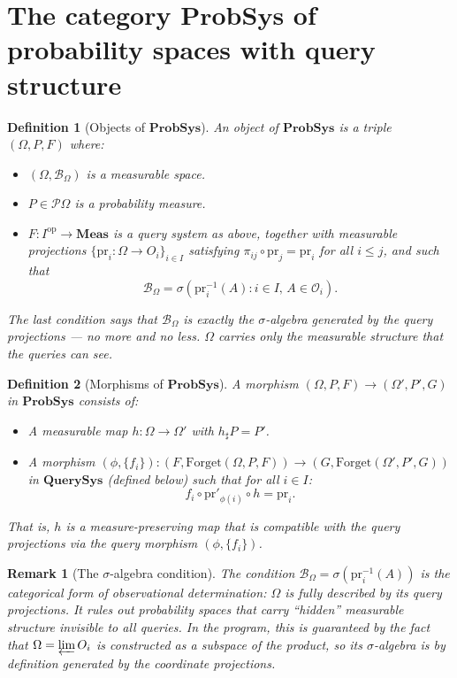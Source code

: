 \documentclass[11pt]{article}
\newtheorem{definition}{Definition}
\newtheorem{remark}{Remark}
\newcommand{\Meas}{\mathbf{Meas}}
\newcommand{\QSys}{\mathbf{QuerySys}}
\newcommand{\PSys}{\mathbf{ProbSys}}
\newcommand{\Pcal}{\mathcal{P}}
\newcommand{\Ocal}{\mathcal{O}}
\newcommand{\Bcal}{\mathcal{B}}
\newcommand{\op}{\mathrm{op}}
\newcommand{\pr}{\mathrm{pr}}
\newcommand{\Forget}{\mathrm{Forget}}
\newcommand{\varlim}{\varprojlim}
\newcommand{\sharppush}{_\sharp}
\begin{document}
\section{The category $\PSys$ of probability spaces with query structure}
\label{sec:psys}

\begin{definition}[Objects of $\PSys$]\label{def:psys-objects}
An object of $\PSys$ is a triple $(\Omega, P, F)$ where:
\begin{itemize}
  \item $(\Omega, \Bcal_\Omega)$ is a measurable space.
  \item $P \in \Pcal\Omega$ is a probability measure.
  \item $F : I^\op \to \Meas$ is a query system as above, together with
    measurable projections $\{\pr_i : \Omega \to O_i\}_{i \in I}$ satisfying
    $\pi_{ij} \circ \pr_j = \pr_i$ for all $i \leq j$, and such that
    \[
      \Bcal_\Omega = \sigma\!\left(\pr_i^{-1}(A) : i \in I,\, A \in \Ocal_i\right).
    \]
\end{itemize}
The last condition says that $\Bcal_\Omega$ is \emph{exactly} the
$\sigma$-algebra generated by the query projections --- no more and no less.
$\Omega$ carries only the measurable structure that the queries can see.
\end{definition}

\begin{definition}[Morphisms of $\PSys$]\label{def:psys-morphisms}
A morphism $(\Omega, P, F) \to (\Omega', P', G)$ in $\PSys$ consists of:
\begin{itemize}
  \item A measurable map $h : \Omega \to \Omega'$ with $h\sharppush P = P'$.
  \item A morphism $(\phi, \{f_i\}) : (F, \Forget(\Omega, P, F)) \to
    (G, \Forget(\Omega', P', G))$ in $\QSys$ (defined below) such that
    for all $i \in I$:
    \[
      f_i \circ \pr'_{\phi(i)} \circ h = \pr_i.
    \]
\end{itemize}
That is, $h$ is a measure-preserving map that is compatible with the
query projections via the query morphism $(\phi, \{f_i\})$.
\end{definition}

\begin{remark}[The $\sigma$-algebra condition]
The condition $\Bcal_\Omega = \sigma(\pr_i^{-1}(A))$ is the categorical
form of \emph{observational determination}: $\Omega$ is fully described by
its query projections.  It rules out probability spaces that carry ``hidden''
measurable structure invisible to all queries.  In the program, this is
guaranteed by the fact that $\Omega = \varlim O_i$ is constructed as a
subspace of the product, so its $\sigma$-algebra is by definition generated
by the coordinate projections.
\end{remark}
\end{document}
